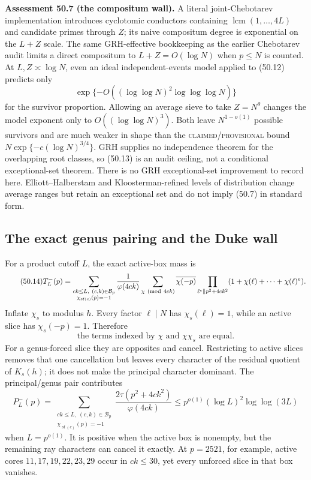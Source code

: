 \documentclass[10pt,reqno]{amsart}
\theoremstyle{definition}
\newcommand{\lcm}{\operatorname {lcm}}
\newcommand{\1}{\mathbf 1}
\begin{document}
\medskip\noindent\textbf{Assessment 50.7 (the compositum wall).}
A literal joint-Chebotarev implementation introduces cyclotomic conductors
containing $\lcm(1,\ldots,4L)$ and candidate primes through $Z$; its naive
compositum degree is exponential on the $L+Z$ scale.  The same
GRH-effective bookkeeping as the earlier Chebotarev audit limits a direct
compositum to $L+Z=O(\log N)$ when $p\leq N$ is counted.  At
$L,Z\asymp\log N$, even an ideal independent-events model applied to
(50.12) predicts only
\begin{equation}\tag{50.13}
 \exp\{-O((\log\log N)^2\log\log\log N)\}
\end{equation}
for the survivor proportion.  Allowing an average sieve to take
$Z=N^\theta$ changes the model exponent only to $O((\log\log N)^3)$.
Both leave $N^{1-o(1)}$ possible survivors and are much weaker in shape
than the \textsc{claimed/provisional} bound
$N\exp\{-c(\log N)^{3/4}\}$.  GRH supplies no independence theorem for the
overlapping root classes, so (50.13) is an audit ceiling, not a conditional
exceptional-set theorem.  There is no GRH exceptional-set improvement to
record here.  Elliott--Halberstam and Kloosterman-refined levels of
distribution change average ranges but retain an exceptional set and do not
imply (50.7) in standard form.

\subsection{The exact genus pairing and the Duke wall}
For a product cutoff $L$, the exact active-box mass is
\begin{equation}\tag{50.14}
 T_L^-(p)=
 \sum_{\substack{ck\leq L,\ (c,k)\in\mathcal B_p\\
                   \chi_{\operatorname {sf}(c)}(p)=-1}}
 \frac1{\varphi(4ck)}\sum_{\chi\ ({\rm mod}\ 4ck)}
 \overline{\chi(-p)}
 \prod_{\ell^e\parallel p^2+4ck^2}
       (1+\chi(\ell)+\cdots+\chi(\ell)^e).
\end{equation}
Inflate $\chi_s$ to modulus $h$.  Every factor $\ell\mid N$ has
$\chi_s(\ell)=1$, while an active slice has $\chi_s(-p)=1$.  Therefore
\begin{equation}\tag{50.15}
 \text{the terms indexed by }\chi
 \text{ and }\chi\chi_s\text{ are equal}.
\end{equation}
For a genus-forced slice they are opposites and cancel.  Restricting to
active slices removes that one cancellation but leaves every character of
the residual quotient of $K_s(h)$; it does not make the principal character
dominant.  The principal/genus pair contributes
\begin{equation}\tag{50.16}
 P_L^-(p)=
 \sum_{\substack{ck\leq L,\ (c,k)\in\mathcal B_p\\
                   \chi_{\operatorname {sf}(c)}(p)=-1}}
 \frac{2\tau(p^2+4ck^2)}{\varphi(4ck)}
 \leq p^{o(1)}(\log L)^2\log\log(3L)
\end{equation}
when $L=p^{o(1)}$.  It is positive when the active box is nonempty, but the
remaining ray characters can cancel it exactly.  At $p=2521$, for example,
active cores $11,17,19,22,23,29$ occur in $ck\leq30$, yet every unforced
slice in that box vanishes.
\end{document}
